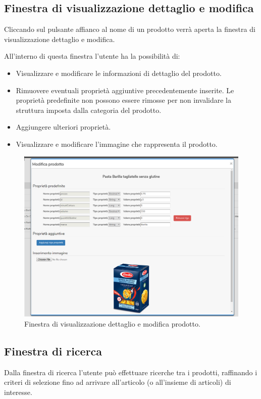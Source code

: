 	\subsection{Finestra di visualizzazione dettaglio e modifica}
		Cliccando sul pulsante  affianco al nome di un prodotto verrà aperta la finestra di visualizzazione dettaglio e modifica.
		
		All'interno di questa finestra l'utente ha la possibilità di:
		\begin{itemize}
			\item Visualizzare e modificare le informazioni di dettaglio del prodotto.
			\item Rimuovere eventuali proprietà aggiuntive precedentemente inserite. Le proprietà predefinite non possono essere rimosse per non invalidare la struttura imposta dalla categoria del prodotto.
			\item Aggiungere ulteriori proprietà.
			\item Visualizzare e modificare l'immagine che rappresenta il prodotto.
		\end{itemize}
		
		\begin{figure}[H]
			\centering
			\includegraphics[width=\textwidth]{immagini/edit-page}
			\caption{Finestra di visualizzazione dettaglio e modifica prodotto.}
		\end{figure}
	
	\subsection{Finestra di ricerca}
		Dalla finestra di ricerca l'utente può effettuare ricerche tra i prodotti, raffinando i criteri di selezione fino ad arrivare all'articolo (o all'insieme di articoli) di interesse.
		
